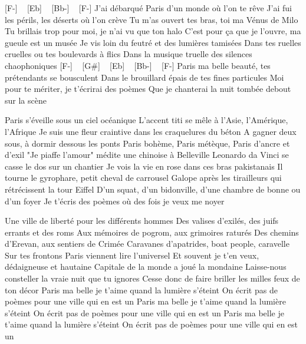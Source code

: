 [F-] ~ [Eb] ~ [Bb-] ~ [F-]
J'ai débarqué Paris d'un monde où l'on te rêve
J'ai fui les périls, les déserts où l'on crève
Tu m'as ouvert tes bras, toi ma Vénus de Milo
Tu brillais trop pour moi, je n'ai vu que ton halo
C'est pour ça que je l'ouvre, ma gueule est un musée
Je vis loin du feutré et des lumières tamisées
Dans tes ruelles cruelles ou tes boulevards à flics
Dans la musique truelle des silences chaophoniques
[F-] ~ [G#] ~ [Eb] ~ [Bb-] ~ [F-]
Paris ma belle beauté, tes prétendants se bousculent
Dans le brouillard épais de tes fines particules
Moi pour te mériter, je t'écrirai des poèmes
Que je chanterai la nuit tombée debout sur la scène


Paris s'éveille sous un ciel océanique
L'accent titi se mêle à l'Asie, l'Amérique, l'Afrique
Je suis une fleur craintive dans les craquelures du béton
A gagner deux sous, à dormir dessous les ponts
Paris bohème, Paris métèque, Paris d'ancre et d'exil
"Je piaffe l'amour" médite une chinoise à Belleville
Leonardo da Vinci se casse le dos sur un chantier
Je vois la vie en rose dans ces bras pakistanais
Il tourne le gyrophare, petit cheval de carrousel
Galope après les tirailleurs qui rétrécissent la tour Eiffel
D'un squat, d'un bidonville, d'une chambre de bonne ou d'un foyer
Je t'écris des poèmes où des fois je veux me noyer


Une ville de liberté pour les différents hommes
Des valises d'exilés, des juifs errants et des roms
Aux mémoires de pogrom, aux grimoires raturés
Des chemins d'Erevan, aux sentiers de Crimée
Caravanes d'apatrides, boat people, caravelle
Sur tes frontons Paris viennent lire l'universel
Et souvent je t'en veux, dédaigneuse et hautaine
Capitale de la monde a joué la mondaine
Laisse-nous consteller la vraie nuit que tu ignores
Cesse donc de faire briller les milles feux de ton décor
Paris ma belle je t'aime quand la lumière s'éteint
On écrit pas de poèmes pour une ville qui en est un
Paris ma belle je t'aime quand la lumière s'éteint
On écrit pas de poèmes pour une ville qui en est un
Paris ma belle je t'aime quand la lumière s'éteint
On écrit pas de poèmes pour une ville qui en est un